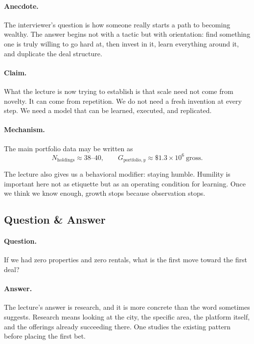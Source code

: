 \paragraph{Anecdote.}
The interviewer's question is how someone really starts a path to becoming wealthy. The answer begins not with a tactic but with orientation: find something one is truly willing to go hard at, then invest in it, learn everything around it, and duplicate the deal structure.

\paragraph{Claim.}
What the lecture is now trying to establish is that scale need not come from novelty. It can come from repetition. We do not need a fresh invention at every step. We need a model that can be learned, executed, and replicated.

\paragraph{Mechanism.}
The main portfolio data may be written as
\begin{equation}
N_{\mathrm{holdings}} \approx 38\text{--}40,
\qquad
G_{\mathrm{portfolio},y} \approx \$1.3\times 10^6 \ \text{gross}.
\end{equation}

The lecture also gives us a behavioral modifier: staying humble. Humility is important here not as etiquette but as an operating condition for learning. Once we think we know enough, growth stops because observation stops.

\subsection{Question \& Answer}

\paragraph{Question.}
If we had zero properties and zero rentals, what is the first move toward the first deal?

\paragraph{Answer.}
The lecture's answer is research, and it is more concrete than the word sometimes suggests. Research means looking at the city, the specific area, the platform itself, and the offerings already succeeding there. One studies the existing pattern before placing the first bet.

